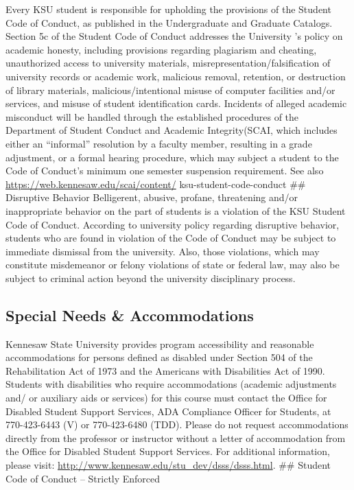 \documentclass[11pt,]{article}
\begin{document}
Every KSU student is responsible for upholding the provisions of the Student Code of Conduct, as published in
the Undergraduate and Graduate Catalogs. Section 5c of the Student Code of Conduct addresses the University
's policy on academic honesty, including provisions regarding plagiarism and cheating, unauthorized access
to university materials, misrepresentation/falsification of university records or academic work, malicious
removal, retention, or destruction of library materials, malicious/intentional misuse of computer facilities and/or
services, and misuse of student identification cards. Incidents of alleged academic misconduct will be
handled through the established procedures of the Department of Student Conduct and Academic
Integrity(SCAI, which includes either an ``informal'' resolution by a faculty member, resulting in a grade
adjustment, or a formal hearing procedure, which may subject a student to the Code of Conduct's
minimum one semester suspension requirement. See also \url{https://web.kennesaw.edu/scai/content/}
ksu-student-code-conduct
\#\# Disruptive Behavior
Belligerent, abusive, profane, threatening and/or inappropriate behavior on the part of students is a violation of
the KSU Student Code of Conduct. According to university policy regarding disruptive behavior, students who
are found in violation of the Code of Conduct may be subject to immediate dismissal from the university. Also,
those violations, which may constitute misdemeanor or felony violations of state or federal law, may also be
subject to criminal action beyond the university disciplinary process.

\hypertarget{special-needs-accommodations}{%
\subsection{Special Needs \& Accommodations}\label{special-needs-accommodations}}

Kennesaw State University provides program accessibility and reasonable accommodations for persons
defined as disabled under Section 504 of the Rehabilitation Act of 1973 and the Americans with
Disabilities Act of 1990. Students with disabilities who require accommodations (academic adjustments and/
or auxiliary aids or services) for this course must contact the Office for Disabled Student Support Services,
ADA Compliance Officer for Students, at 770-423-6443 (V) or 770-423-6480 (TDD). Please do not request
accommodations directly from the professor or instructor without a letter of accommodation from the
Office for Disabled Student Support Services. For additional information, please visit: \url{http://www.kennesaw.edu/stu_dev/dsss/dsss.html}.
\#\# Student Code of Conduct -- Strictly Enforced
\end{document}
